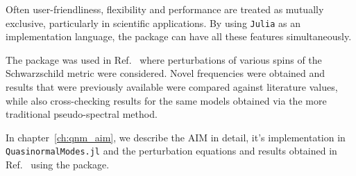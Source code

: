 Often user-friendliness, flexibility and performance are treated as mutually exclusive, particularly in scientific applications. By using \texttt{Julia} as an implementation language, the package can have all these features simultaneously.

The package was used in Ref.~\cite{Mamani2022} where perturbations of various spins of the Schwarzschild metric were considered. Novel frequencies were obtained and results that were previously available were compared against literature values, while also cross-checking results for the same models obtained via the more traditional pseudo-spectral method.

In chapter~\ref{ch:qnm_aim}, we describe the AIM in detail, it's implementation in \texttt{QuasinormalModes.jl} and the perturbation equations and results obtained in Ref.~\cite{Mamani2022} using the package.